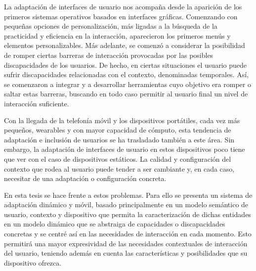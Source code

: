 \begin{resumen} %

La adaptación de interfaces de usuario nos acompaña desde la aparición de los
primeros sistemas operativos basados en interfaces gráficas. Comenzando con
pequeñas opciones de personalización, más ligadas a la búsqueda de la practicidad
y eficiencia en la interacción, aparecieron los primeros menús y elementos
personalizables. Más adelante, se comenzó a considerar la posibilidad de romper
ciertas barreras de interacción provocadas por las posibles discapacidades de
los usuarios. De hecho, en ciertas situaciones el usuario puede sufrir 
discapacidades relacionadas con el contexto, denominadas temporales.  Así, 
se comenzaron a integrar y a desarrollar herramientas cuyo objetivo era romper 
o saltar estas barreras, buscando en todo caso permitir al usuario final un nivel 
de interacción suficiente.

Con la llegada de la telefonía móvil y los dispositivos portátiles, cada vez
más pequeños, wearables y con mayor capacidad de cómputo, esta tendencia de 
adaptación e inclusión de usuarios se ha trasladado también a este área. Sin
embargo, la adaptación de interfaces de usuario en estos dispositivos poco
tiene que ver con el caso de dispositivos estáticos. La calidad y configuración
del contexto que rodea al usuario puede tender a ser cambiante y, en cada caso,
necesitar de una adaptación o configuración concreta.

En esta tesis se hace frente a estos problemas. Para ello se presenta un sistema
de adaptación dinámico y móvil, basado principalmente en un modelo semántico de
usuario, contexto y dispositivo que permita la caracterización de dichas
entidades en un modelo dinámico que se abstraiga de capacidades o discapacidades
concretas y se centré así en las necesidades de interacción en cada momento.
Esto permitirá una mayor expresividad de las necesidades contextuales de
interacción del usuario, teniendo además en cuenta las características y
posibilidades que su dispositivo ofrezca.


\end{resumen}











